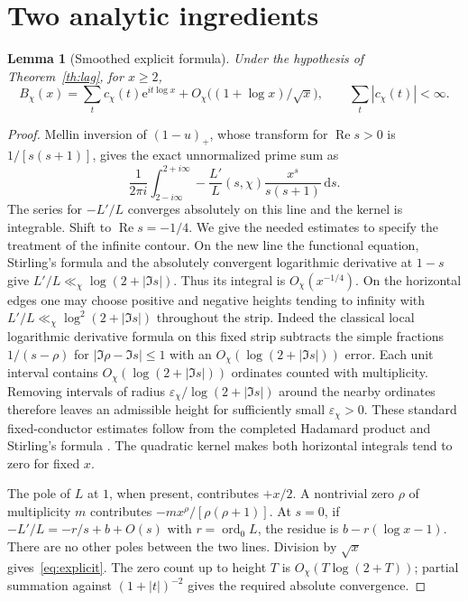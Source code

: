 \documentclass[11pt]{article}
\newtheorem{lemma}[theorem]{Lemma}
\newcommand{\e}{\mathrm e}
\newcommand{\dd}{\mathrm d}
\DeclareMathOperator{\Rea}{Re}
\begin{document}
\newpage
\section{Two analytic ingredients}
\begin{lemma}[Smoothed explicit formula]\label{lem:explicit}
Under the hypothesis of Theorem~\ref{th:lag}, for $x\ge2$,
\begin{equation}\label{eq:explicit}
 B_\chi(x)=\sum_t c_\chi(t)\e^{it\log x}
 +O_\chi\big((1+\log x)/\sqrt x\big),
 \qquad \sum_t |c_\chi(t)|<\infty .
\end{equation}
\end{lemma}

\begin{proof}
Mellin inversion of $(1-u)_+$, whose transform for $\Rea s>0$
is $1/[s(s+1)]$, gives the exact unnormalized prime sum as
\[
 \frac1{2\pi i}\int_{2-i\infty}^{2+i\infty}
 -\frac{L'}{L}(s,\chi)\frac{x^s}{s(s+1)}\,\dd s .
\]
The series for $-L'/L$ converges absolutely on this line and the kernel
is integrable. Shift to $\Rea s=-1/4$. We give the needed estimates to
specify the treatment of the infinite contour. On the new line the
functional equation, Stirling's formula and the absolutely convergent
logarithmic derivative at $1-s$ give
$L'/L\ll_\chi\log(2+|\Im s|)$. Thus its integral is $O_\chi(x^{-1/4})$.
On the horizontal edges one may choose positive and negative heights
tending to infinity with $L'/L\ll_\chi\log^2(2+|\Im s|)$ throughout
the strip. Indeed the classical local logarithmic derivative formula
on this fixed strip subtracts the simple fractions $1/(s-\rho)$ for
$|\Im\rho-\Im s|\le1$ with an $O_\chi(\log(2+|\Im s|))$ error.
Each unit interval contains $O_\chi(\log(2+|\Im s|))$ ordinates
counted with multiplicity. Removing intervals of radius
$\varepsilon_\chi/\log(2+|\Im s|)$ around the nearby ordinates
therefore leaves an admissible height for sufficiently small
$\varepsilon_\chi>0$. These standard fixed-conductor estimates follow
from the completed Hadamard product and Stirling's formula
\cite{davenport,bennett}. The quadratic kernel makes both horizontal
integrals tend to zero for fixed $x$.

The pole of $L$ at $1$, when present, contributes $+x/2$.
A nontrivial zero $\rho$ of multiplicity $m$ contributes
$-m x^\rho/[\rho(\rho+1)]$. At $s=0$, if
$-L'/L=-r/s+b+O(s)$ with $r=\operatorname{ord}_0 L$, the residue is
$b-r(\log x-1)$. There are no other poles between the two lines.
Division by $\sqrt x$ gives~\eqref{eq:explicit}. The zero count up to
height $T$ is $O_\chi(T\log(2+T))$; partial summation against
$(1+|t|)^{-2}$ gives the required absolute convergence.
\end{proof}
\end{document}
